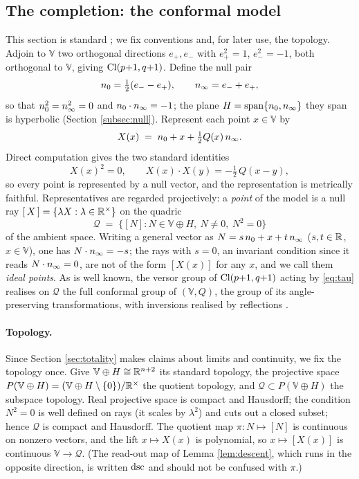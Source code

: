 \subsection{The completion: the conformal model}\label{sec:model}

This section is standard \cite{Hestenes2001, HLR2001, DFM2007, DoranLasenby2003}; we fix conventions and, for later use, the topology. Adjoin to $\mathbb{V}$ two orthogonal directions $e_+, e_-$ with $e_+^2 = 1$, $e_-^2 = -1$, both orthogonal to $\mathbb{V}$, giving $\mathrm{Cl}(p{+}1, q{+}1)$. Define the null pair
\[
n_0 = \tfrac12(e_- - e_+), \qquad n_\infty = e_- + e_+,
\]
so that $n_0^2 = n_\infty^2 = 0$ and $n_0 \cdot n_\infty = -1$; the plane $H = \mathrm{span}\{n_0, n_\infty\}$ they span is hyperbolic (Section \ref{subsec:null}). Represent each point $x \in \mathbb{V}$ by
\begin{equation}\label{eq:lift}
X(x) \;=\; n_0 + x + \tfrac12 Q(x)\, n_\infty .
\end{equation}
Direct computation gives the two standard identities
\begin{equation}\label{eq:nullity}
X(x)^2 = 0, \qquad X(x)\cdot X(y) = -\tfrac12\, Q(x-y),
\end{equation}
so every point is represented by a null vector, and the representation is metrically faithful. Representatives are regarded projectively: a \emph{point} of the model is a null ray $[\,X\,] = \{\lambda X : \lambda \in \mathbb{R}^\times\}$ on the quadric
\[
\mathcal{Q} \;=\; \{[N] : N \in \mathbb{V} \oplus H,\ N \neq 0,\ N^2 = 0\}
\]
of the ambient space. Writing a general vector as $N = s\,n_0 + x + t\,n_\infty$ ($s, t \in \mathbb{R}$, $x \in \mathbb{V}$), one has $N \cdot n_\infty = -s$; the rays with $s = 0$, an invariant condition since it reads $N \cdot n_\infty = 0$, are not of the form $[X(x)]$ for any $x$, and we call them \emph{ideal points}. As is well known, the versor group of $\mathrm{Cl}(p{+}1,q{+}1)$ acting by \eqref{eq:tau} realises on $\mathcal{Q}$ the full conformal group of $(\mathbb{V}, Q)$, the group of its angle-preserving transformations, with inversions realised by reflections \cite{HLR2001, Angles2008}.

\paragraph{Topology.} Since Section \ref{sec:totality} makes claims about limits and continuity, we fix the topology once. Give $\mathbb{V} \oplus H \cong \mathbb{R}^{n+2}$ its standard topology, the projective space $P(\mathbb{V} \oplus H) = (\mathbb{V} \oplus H \setminus \{0\})/\mathbb{R}^{\times}$ the quotient topology, and $\mathcal{Q} \subset P(\mathbb{V} \oplus H)$ the subspace topology. Real projective space is compact and Hausdorff; the condition $N^2 = 0$ is well defined on rays (it scales by $\lambda^2$) and cuts out a closed subset; hence $\mathcal{Q}$ is compact and Hausdorff. The quotient map $\pi : N \mapsto [N]$ is continuous on nonzero vectors, and the lift $x \mapsto X(x)$ is polynomial, so $x \mapsto [X(x)]$ is continuous $\mathbb{V} \to \mathcal{Q}$. (The read-out map of Lemma \ref{lem:descent}, which runs in the opposite direction, is written $\mathrm{dsc}$ and should not be confused with $\pi$.)

